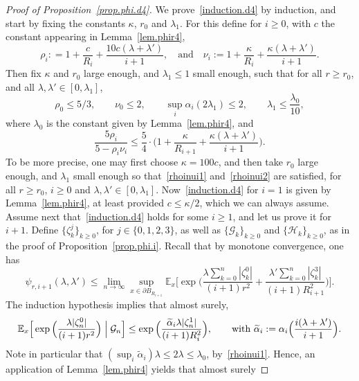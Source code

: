 \documentclass[11pt]{article}
\numberwithin{equation}{section}
\theoremstyle{plain}
\theoremstyle{definition}
\newcommand{\1}{{\text{\Large $\mathfrak 1$}}}
\begin{document}
\begin{proof}[Proof of Proposition~\ref{prop.phi.d4}]
We prove~\eqref{induction.d4} by induction, and start by fixing the constants $\kappa$, $r_0$ and $\lambda_1$. For this define for $i\ge 0$, with $c$ the constant appearing in Lemma~\ref{lem.phir4},
\[
\rho_i : = 1+\frac{c}{R_i} + \frac{10c(\lambda + \lambda')}{i+1},\quad \text{and}\quad \nu_i:= 1+\frac{\kappa }{R_i} + \frac{\kappa(\lambda + \lambda')}{i+1}.
\]
Then fix $\kappa$ and $r_0$ large enough, and $\lambda_1\le 1$ small enough, such that for all $r\ge r_0$, and all $\lambda, \lambda'\in[0,\lambda_1]$,
\begin{equation}\label{rhoinui1}
\rho_0 \le 5/3, \qquad \nu_0\le 2, \qquad \sup_i \alpha_i(2\lambda_1)\le 2, \qquad \lambda_1\le \frac{\lambda_0}{10},
\end{equation}
where $\lambda_0$ is the constant given by Lemma~\ref{lem.phir4}, and
\begin{equation}\label{rhoinui2}
\frac{5\rho_i}{5-\rho_i\nu_i} \le \frac{5}{4}\cdot \Big(1+\frac{\kappa }{R_{i+1}} + \frac{\kappa(\lambda+\lambda')}{i+1}\Big).
\end{equation}
To be more precise, one may first choose $\kappa=100c$, and then take $r_0$ large enough, and $\lambda_1$ small enough
so that~\eqref{rhoinui1} and~\eqref{rhoinui2} are satisfied, for all $r\ge r_0$, $i\ge 0$ and $\lambda, \lambda'\in[0,\lambda_1]$.
Now~\eqref{induction.d4} for $i=1$ is given by Lemma~\ref{lem.phir4}, at least provided
$c\le \kappa/2$, which we can always assume.
Assume next that~\eqref{induction.d4} holds for some $i\ge 1$, and let us prove it for $i+1$. Define $\{\zeta_k^j\}_{k\ge 0}$, for $j\in \{0,1,2,3\}$,
as well as $\{\mathcal G_k\}_{k\ge 0}$ and $\{\mathcal H_k\}_{k\ge 0}$, as in the proof of Proposition~\ref{prop.phi.i}.
Recall that by monotone convergence, one has
\begin{equation*}%
\psi_{r,i+1}(\lambda,\lambda') \le \lim_{n \to \infty} \sup_{x\in \partial B_{R_{i+1}}}
\mathbb E_x\Big[\exp\Big(\frac{\lambda\sum_{k=0}^n |\zeta_k^0|}{(i+1)r^2}+\frac{\lambda'\sum_{k=0}^n |\zeta^3_k|}{(i+1)R_{i+1}^2}\Big)\Big].
\end{equation*}
The induction hypothesis implies that almost surely,
\[
\mathbb E_x\Big[\exp\Big(\frac{\lambda |\zeta_n^0|}{(i+1)r^2}\Big) \Bigm|\mathcal G_n \Big] \le
\exp\Big(\frac{\widetilde \alpha_i \lambda|\zeta_n^1|}{(i+1)R_i^2}\Big),\qquad \text{with }\widetilde \alpha_i: = \alpha_i\Big(\frac{i(\lambda+\lambda')}{i+1}\Big).
\]
Note in particular that $(\sup_i \widetilde \alpha_i)\lambda \le 2\lambda \le \lambda_0$, by~\eqref{rhoinui1}. Hence, an application of Lemma~\ref{lem.phir4} yields that almost surely

\end{proof}
\end{document}
